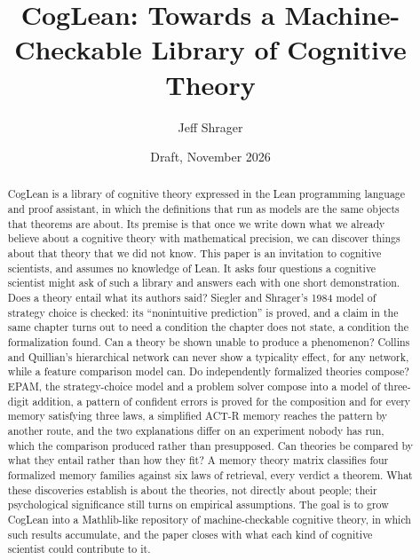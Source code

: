\documentclass[11pt]{article}
\title{CogLean: Towards a Machine-Checkable Library of Cognitive Theory}
\author{Jeff Shrager}
\date{Draft, November 2026}
\begin{document}
\sloppy
\maketitle

\begin{center}
\end{center}

\medskip

\begin{abstract}
CogLean is a library of cognitive theory expressed in the Lean
programming language and proof assistant, in which the definitions
that run as models are the same objects that theorems are about. Its
premise is that once we write down what we already believe about a
cognitive theory with mathematical precision, we can discover things
about that theory that we did not know. This paper is an invitation
to cognitive scientists, and assumes no knowledge of Lean. It asks
four questions a cognitive scientist might ask of such a library and
answers each with one short demonstration. Does a theory entail what
its authors said? Siegler and Shrager's 1984 model of strategy choice
is checked: its ``nonintuitive prediction'' is proved, and a claim in
the same chapter turns out to need a condition the chapter does not
state, a condition the formalization found. Can a theory be shown unable to
produce a phenomenon? Collins and Quillian's hierarchical network can
never show a typicality effect, for any network, while a feature
comparison model can. Do independently formalized theories compose?
EPAM, the strategy-choice model and a problem solver compose into a
model of three-digit addition, a pattern of confident errors is proved
for the composition and for every memory satisfying three laws, a
simplified ACT-R memory reaches the pattern by another route, and the
two explanations differ on an experiment nobody has run, which the
comparison produced rather than presupposed. Can theories
be compared by what they entail rather than how they fit? A memory
theory matrix classifies four formalized memory families against six
laws of retrieval, every verdict a theorem. What these discoveries
establish is about the theories, not directly about people; their
psychological significance still turns on empirical assumptions. The
goal is to grow CogLean into a Mathlib-like repository of
machine-checkable cognitive theory, in which such results accumulate,
and the paper closes with what each kind of cognitive scientist could
contribute to it.
\end{abstract}
\end{document}

